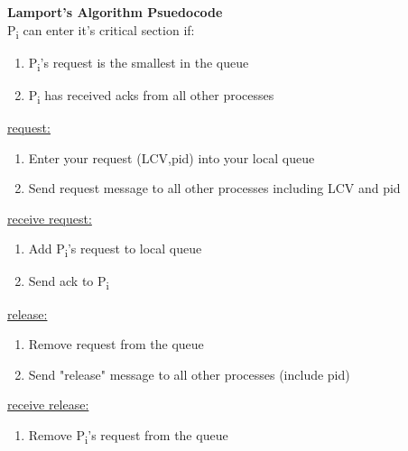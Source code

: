 \documentclass[twoside]{article}
\begin{document}
\textbf{Lamport's Algorithm Psuedocode} \\
P\textsubscript{i} can enter it's critical section if:
\begin{enumerate}
    \item P\textsubscript{i}'s request is the smallest in the queue
    \item P\textsubscript{i} has received acks from all other processes
\end{enumerate}
\underline{request:}
\begin{enumerate}
    \item Enter your request (LCV,pid) into your local queue
    \item Send request message to all other processes including LCV and pid
\end{enumerate}
\underline{receive request:}
\begin{enumerate}
    \item Add P\textsubscript{i}'s request to local queue
    \item Send ack to P\textsubscript{i}
\end{enumerate}
\underline{release:}
\begin{enumerate}
    \item Remove request from the queue
    \item Send "release" message to all other processes (include pid)
\end{enumerate}
\underline{receive release:}
\begin{enumerate}
    \item Remove P\textsubscript{i}'s request from the queue
\end{enumerate}
\end{document}

